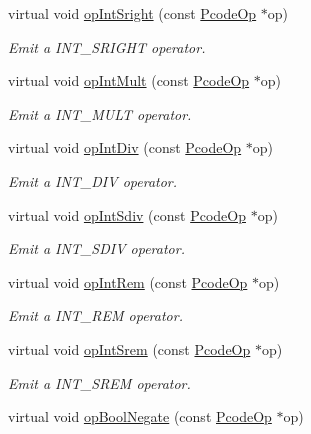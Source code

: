 \begin{DoxyCompactItemize}
virtual void \mbox{\hyperlink{class_print_c_a8e9846476c8c441759f901a6412c03c9}{op\+Int\+Sright}} (const \mbox{\hyperlink{class_pcode_op}{Pcode\+Op}} $\ast$op)
\begin{DoxyCompactList}\small\item\em Emit a I\+N\+T\+\_\+\+S\+R\+I\+G\+HT operator. \end{DoxyCompactList}\item 
virtual void \mbox{\hyperlink{class_print_c_ac3585351e69db562ef82fab6790afefa}{op\+Int\+Mult}} (const \mbox{\hyperlink{class_pcode_op}{Pcode\+Op}} $\ast$op)
\begin{DoxyCompactList}\small\item\em Emit a I\+N\+T\+\_\+\+M\+U\+LT operator. \end{DoxyCompactList}\item 
virtual void \mbox{\hyperlink{class_print_c_a73bee065168f4a48c49579963010ce1b}{op\+Int\+Div}} (const \mbox{\hyperlink{class_pcode_op}{Pcode\+Op}} $\ast$op)
\begin{DoxyCompactList}\small\item\em Emit a I\+N\+T\+\_\+\+D\+IV operator. \end{DoxyCompactList}\item 
virtual void \mbox{\hyperlink{class_print_c_ac373e04258e37c67178aeb5572a1218f}{op\+Int\+Sdiv}} (const \mbox{\hyperlink{class_pcode_op}{Pcode\+Op}} $\ast$op)
\begin{DoxyCompactList}\small\item\em Emit a I\+N\+T\+\_\+\+S\+D\+IV operator. \end{DoxyCompactList}\item 
virtual void \mbox{\hyperlink{class_print_c_a4319557567a7814b2d32121e58f440ef}{op\+Int\+Rem}} (const \mbox{\hyperlink{class_pcode_op}{Pcode\+Op}} $\ast$op)
\begin{DoxyCompactList}\small\item\em Emit a I\+N\+T\+\_\+\+R\+EM operator. \end{DoxyCompactList}\item 
virtual void \mbox{\hyperlink{class_print_c_a65d837d2abf7b899e802983b2150b451}{op\+Int\+Srem}} (const \mbox{\hyperlink{class_pcode_op}{Pcode\+Op}} $\ast$op)
\begin{DoxyCompactList}\small\item\em Emit a I\+N\+T\+\_\+\+S\+R\+EM operator. \end{DoxyCompactList}\item 
virtual void \mbox{\hyperlink{class_print_c_a418083c5e374bc1acd6be75bb95971d9}{op\+Bool\+Negate}} (const \mbox{\hyperlink{class_pcode_op}{Pcode\+Op}} $\ast$op)

\end{DoxyCompactItemize}
